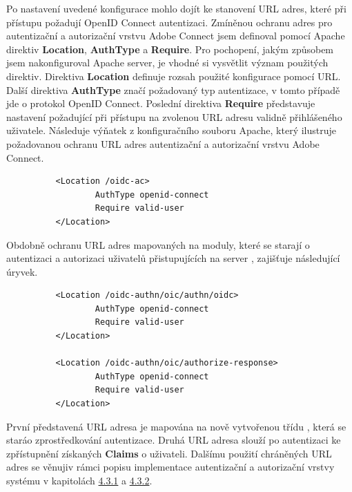 \documentclass[
  printed, %
  twoside, %
  table,   %
  nolof,     %
  nolot,     %
]{fithesis3}
\begin{document}
Po nastavení uvedené konfigurace mohlo dojít ke stanovení URL adres, které při přístupu požadují OpenID Connect autentizaci. Zmíněnou ochranu adres pro autentizační a autorizační vrstvu Adobe Connect jsem definoval pomocí Apache direktiv \textbf{Location}, \textbf{AuthType} a \textbf{Require}. Pro pochopení, jakým způsobem jsem nakonfiguroval Apache server, je vhodné si vysvětlit význam použitých direktiv. Direktiva \textbf{Location} definuje rozsah použité konfigurace pomocí URL. Další direktiva \textbf{AuthType} značí požadovaný typ autentizace, v tomto případě jde o protokol OpenID Connect. Poslední direktiva \textbf{Require} představuje nastavení požadující při přístupu na zvolenou URL adresu validně přihlášeného uživatele. Následuje výňatek z konfiguračního souboru Apache, který ilustruje požadovanou ochranu URL adres autentizační a autorizační vrstvu Adobe Connect.
\begin{lstlisting}
          <Location /oidc-ac>
                  AuthType openid-connect
                  Require valid-user
          </Location>
\end{lstlisting}
\label{ac-location}

Obdobně ochranu URL adres mapovaných na moduly, které se starají o autentizaci a autorizaci uživatelů přistupujících na server , zajišťuje následující úryvek. 

\begin{lstlisting}
          <Location /oidc-authn/oic/authn/oidc>
                  AuthType openid-connect
                  Require valid-user
          </Location>
          
          <Location /oidc-authn/oic/authorize-response>
                  AuthType openid-connect
                  Require valid-user
          </Location>
\end{lstlisting}
První představená URL adresa  je mapována na nově vytvořenou třídu , která se stará\break o zprostředkování autentizace. Druhá URL adresa  slouží po autentizaci ke zpřístupnění získaných \textbf{Claims} o uživateli. Dalšímu použití  chráněných URL adres se věnuji\break v rámci popisu implementace autentizační a autorizační vrstvy systému  v kapitolách \hyperref[ShongoImpl-authn]{4.3.1} a \hyperref[ShongoImpl-authr]{4.3.2}.

\label{shongo-location}
\end{document}
